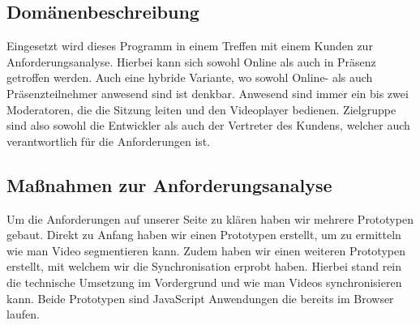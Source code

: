 \subsection{Domänenbeschreibung}
    Eingesetzt wird dieses Programm in einem Treffen mit einem Kunden zur Anforderungsanalyse.
    Hierbei kann sich sowohl Online als auch in Präsenz getroffen werden. Auch eine hybride Variante,
    wo sowohl Online- als auch Präsenzteilnehmer anwesend sind ist denkbar. 
    Anwesend sind immer ein bis zwei Moderatoren, die die Sitzung leiten und den Videoplayer bedienen.
	Zielgruppe sind also sowohl die Entwickler als auch der Vertreter des Kundens, welcher auch verantwortlich für die Anforderungen ist.
\subsection{Maßnahmen zur Anforderungsanalyse}
    Um die Anforderungen auf unserer Seite zu klären haben wir mehrere Prototypen gebaut.
    Direkt zu Anfang haben wir einen Prototypen erstellt, um zu ermitteln wie man Video segmentieren kann.
    Zudem haben wir einen weiteren Prototypen erstellt, mit welchem wir die Synchronisation erprobt haben.
    Hierbei stand rein die technische Umsetzung im Vordergrund und wie man Videos synchronisieren kann.
    Beide Prototypen sind JavaScript Anwendungen die bereits im Browser laufen.